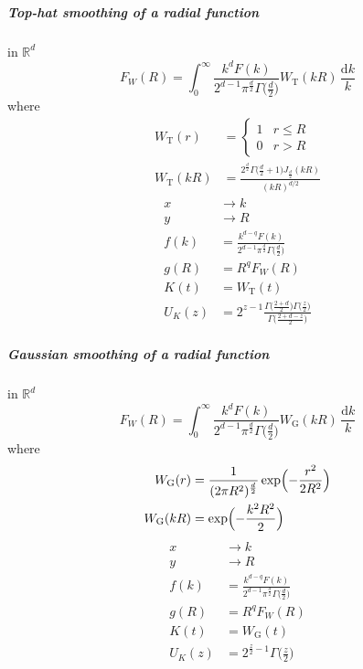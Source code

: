 \documentclass{article}
\renewcommand{\d}{\mathrm{d}}
\newcommand{\Mellin}{U}
\newcommand{\Tophat}{\mathrm{T}}
\newcommand{\Gauss}{\mathrm{G}}
\begin{document}
\subparagraph{Top-hat smoothing of a radial function}
in $\mathbb{R}^d$
\begin{equation}
    F_W(R) = \int_0^\infty \frac{k^d F(k)}{2^{d-1}\pi^\frac{d}2\Gamma\bigl(\frac{d}2\bigr)}
                    W_\Tophat(kR) \,\frac{\d k}k
\end{equation}
where
\begin{align}
    W_\Tophat(r) &= \begin{cases}
        1 & r\leq R \\
        0 & r > R
    \end{cases} \\
    W_\Tophat(kR) &= \frac{2^\frac{d}2\Gamma\bigl(\frac{d}2+1\bigr)J_\frac{d}2(kR)}{(kR)^{d/2}}
\end{align}
\begin{align}
    x &\to k \\
    y &\to R \\
    f(k) &= \frac{k^{d-q}F(k)}{2^{d-1}\pi^\frac{d}2\Gamma\bigl(\frac{d}2\bigr)} \\
    g(R) &= R^q F_W(R) \\
    K(t) &= W_\Tophat(t) \\
    \Mellin_K(z) &= 2^{z-1} \frac{\Gamma\bigl(\frac{2+d}2\bigr)\Gamma\bigl(\frac{z}2\bigr)}
                        {\Gamma\bigl(\frac{2+d-z}2\bigr)}
\end{align}


\subparagraph{Gaussian smoothing of a radial function}
in $\mathbb{R}^d$
\begin{equation}
    F_W(R) = \int_0^\infty \frac{k^d F(k)}{2^{d-1}\pi^\frac{d}2\Gamma\bigl(\frac{d}2\bigr)}
                    W_\Gauss(kR) \,\frac{\d k}k
\end{equation}
where
\begin{align}
    W_\Gauss(r) &= \frac1{(2\pi R^2)^\frac{d}2} \exp\Bigl(-\frac{r^2}{2R^2}\Bigr) \\
    W_\Gauss(kR) &= \exp\Bigl(-\frac{k^2R^2}2\Bigr)
\end{align}
\begin{align}
    x &\to k \\
    y &\to R \\
    f(k) &= \frac{k^{d-q}F(k)}{2^{d-1}\pi^\frac{d}2\Gamma\bigl(\frac{d}2\bigr)} \\
    g(R) &= R^q F_W(R) \\
    K(t) &= W_\Gauss(t) \\
    \Mellin_K(z) &= 2^{\frac{z}2-1} \Gamma\bigl(\tfrac{z}2\bigr)
\end{align}
\end{document}
